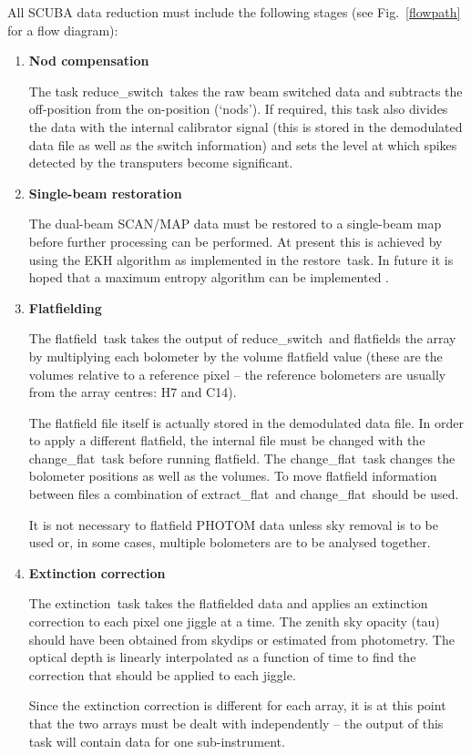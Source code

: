 \documentclass[twoside,11pt]{article}
\newcommand{\task}[1]{{\sf #1}}
\newcommand{\chgflat}{\htmlref{\task{change\_flat}}{CHANGE_FLAT}}
\newcommand{\resw}{\htmlref{\task{reduce\_switch}}{REDUCE_SWITCH}}
\newcommand{\flatf}{\htmlref{\task{flatfield}}{FLATFIELD}}
\newcommand{\ext}{\htmlref{\task{extinction}}{EXTINCTION}}
\newcommand{\restore}{\htmlref{\task{restore}}{RESTORE}}
\newcommand{\extflat}{\htmlref{\task{extract\_flat}}{EXTRACT_FLAT}}
\newcommand{\htmlref}[2]{#1}
\begin{document}
All SCUBA data reduction must include the following stages (see Fig.\
\ref{flowpath} for a flow diagram):
\begin{enumerate}
\item {\bf Nod compensation} 

The task \resw\ takes the raw beam switched data and subtracts the
off-position from the on-position (`nods'). If required, this task also
divides the data with the internal calibrator signal (this is stored in
the demodulated data file as well as the switch information) and sets the
level at which spikes detected by the transputers become significant. 

\item {\bf Single-beam restoration}

The dual-beam SCAN/MAP data must be restored to a single-beam map
before further processing can be performed. At present this is achieved
by using the EKH algorithm \cite{ekh} as implemented in the 
\restore\ task. In future it is hoped that a maximum entropy algorithm
can be implemented \cite{R92}.


\item {\bf Flatfielding}

The \flatf\ task takes the output of \resw\ and flatfields the array by
multiplying each bolometer by the volume flatfield value (these are the
volumes relative to a reference pixel -- the reference bolometers are 
usually from the array centres: H7 and C14).

The flatfield file itself is actually stored in the demodulated data file. In
order to apply a different flatfield, the internal file must be changed with
the \chgflat\ task before running \flatf.  The \chgflat\ task changes the
bolometer positions as well as the volumes. To move flatfield information
between files a combination of \extflat\ and \chgflat\ should be used.

It is not necessary to flatfield PHOTOM data unless sky removal is to be used
or, in some cases, multiple bolometers are to be analysed together.

\item {\bf Extinction correction}

The \ext\ task takes the flatfielded data and applies an extinction
correction to each pixel one jiggle at a time. The zenith sky opacity (tau)
should have been obtained from skydips or estimated from photometry. The
optical depth is linearly interpolated as a function of time to find the
correction that should be applied to each jiggle.

Since the extinction correction is different for each array, it is at this
point that the two arrays must be dealt with independently -- the output of
this task will contain data for one sub-instrument.


\end{enumerate}
\end{document}
